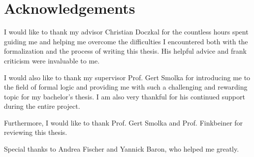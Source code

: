 \section*{Acknowledgements}
I would like to thank my advisor Christian Doczkal for the countless hours spent guiding me and helping me overcome the difficulties I encountered both with the formalization and the process of writing this thesis.
His helpful advice and frank criticism were invaluable to me.

I would also like to thank my supervisor Prof. Gert Smolka for introducing me to the 
field of formal logic and providing me with such a challenging and rewarding topic for my bachelor's thesis.
I am also very thankful for his continued support during the entire project.

Furthermore, I would like to thank Prof. Gert Smolka and Prof. Finkbeiner for reviewing this thesis.

Special thanks to Andrea Fischer and Yannick Baron, who helped me greatly.
